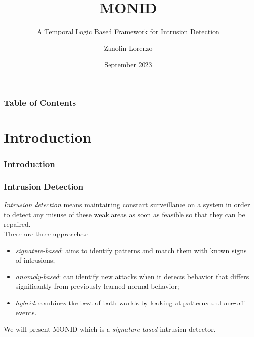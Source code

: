 \documentclass[aspectratio=169,t,xcolor=table]{beamer}
\begin{document}
\title[Inf UFG]{MONID}
\subtitle{A Temporal Logic Based Framework for Intrusion Detection}

\author{Zanolin Lorenzo}

\date{September 2023}
\frame[noframenumbering]{\titlepage}


\begin{frame}
    \frametitle{Table of Contents}
    \tableofcontents
\end{frame}

\section{Introduction}

\begin{frame}{}
    \frametitle{Introduction}
\end{frame}

\begin{frame}
    \frametitle{Intrusion Detection}
    \textit{Intrusion detection} means maintaining constant surveillance on a system in order to detect any misuse of these weak areas as soon as feasible so that they can be repaired.\\
    There are three approaches:
    \begin{itemize}
        \item \textit{signature-based}: aims to identify patterns and match them with known signs of intrusions;
        \item \textit{anomaly-based}: can identify new attacks when it detects behavior that differs significantly from previously learned normal behavior;
        \item \textit{hybrid}: combines the best of both worlds by looking at patterns and one-off events.
    \end{itemize}
    \vspace{5mm}
    We will present MONID which is a \textit{signature-based} intrusion detector.
\end{frame}
\end{document}
